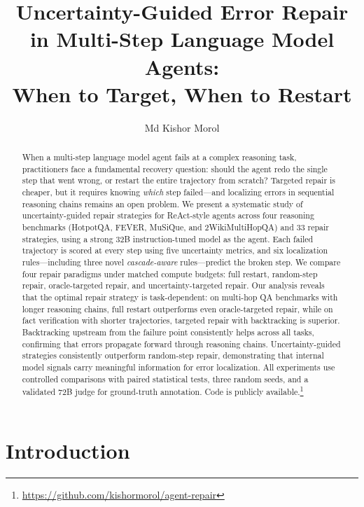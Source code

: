 \documentclass[letterpaper]{article}
\title{Uncertainty-Guided Error Repair in Multi-Step Language Model Agents:\\When to Target, When to Restart}
\author{
  Md Kishor Morol
}
\begin{document}
\maketitle

\begin{abstract}
When a multi-step language model agent fails at a complex reasoning task, practitioners face a fundamental recovery question: should the agent redo the single step that went wrong, or restart the entire trajectory from scratch? Targeted repair is cheaper, but it requires knowing \emph{which} step failed---and localizing errors in sequential reasoning chains remains an open problem. We present a systematic study of uncertainty-guided repair strategies for ReAct-style agents across four reasoning benchmarks (HotpotQA, FEVER, MuSiQue, and 2WikiMultiHopQA) and 33 repair strategies, using a strong 32B instruction-tuned model as the agent. Each failed trajectory is scored at every step using five uncertainty metrics, and six localization rules---including three novel \emph{cascade-aware} rules---predict the broken step. We compare four repair paradigms under matched compute budgets: full restart, random-step repair, oracle-targeted repair, and uncertainty-targeted repair. Our analysis reveals that the optimal repair strategy is task-dependent: on multi-hop QA benchmarks with longer reasoning chains, full restart outperforms even oracle-targeted repair, while on fact verification with shorter trajectories, targeted repair with backtracking is superior. Backtracking upstream from the failure point consistently helps across all tasks, confirming that errors propagate forward through reasoning chains. Uncertainty-guided strategies consistently outperform random-step repair, demonstrating that internal model signals carry meaningful information for error localization. All experiments use controlled comparisons with paired statistical tests, three random seeds, and a validated 72B judge for ground-truth annotation. Code is publicly available.\footnote{\url{https://github.com/kishormorol/agent-repair}}
\end{abstract}

\section{Introduction}
\end{document}
